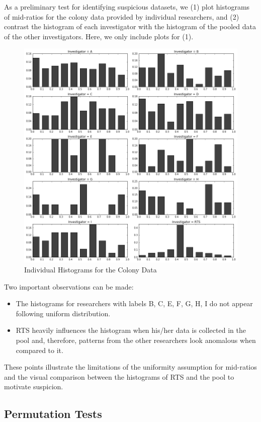\documentclass{article}
\begin{document}
    As a preliminary test for identifying suspicious datasets, we (1) plot histograms of mid-ratios for the colony data provided by individual researchers, 
    and (2) contrast the histogram of each investigator with the histogram of the pooled data of the other investigators. 
    Here, we only include plots for (1). 
\begin{figure}[H]
\centering
\includegraphics[width=0.8\linewidth]{images/new_mid_ratio.png}
\caption{Individual Histograms for the Colony Data}
\label{ind_mid_ratio}
\end{figure}

Two important observations can be made:
\begin{itemize}
\item
  The histograms for researchers with labels B, C, E, F, G, H, I do not
  appear following uniform distribution.
\item
  RTS heavily influences the histogram when his/her data is collected in the pool and, therefore, patterns from the other researchers look anomalous when compared to it.
\end{itemize}

These points illustrate the limitations of the uniformity assumption for
mid-ratios and the visual comparison between the histograms of RTS and the pool to motivate suspicion. 


    \subsection{Permutation Tests}\label{quick-primer-to-permutation-tests}
\end{document}
